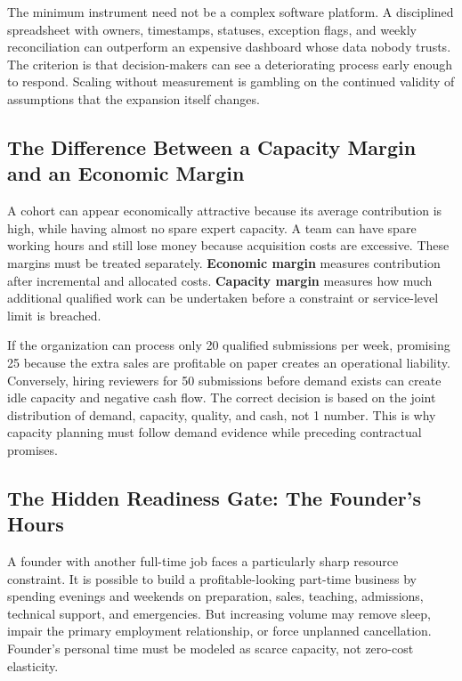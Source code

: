 The minimum instrument need not be a complex software platform. A disciplined spreadsheet with owners, timestamps, statuses, exception flags, and weekly reconciliation can outperform an expensive dashboard whose data nobody trusts. The criterion is that decision-makers can see a deteriorating process early enough to respond. Scaling without measurement is gambling on the continued validity of assumptions that the expansion itself changes.

\subsection{The Difference Between a Capacity Margin and an Economic Margin}
\label{sec:capacity_vs_economic_margin}

A cohort can appear economically attractive because its average contribution is high, while having almost no spare expert capacity. A team can have spare working hours and still lose money because acquisition costs are excessive. These margins must be treated separately. \textbf{Economic margin} measures contribution after incremental and allocated costs. \textbf{Capacity margin} measures how much additional qualified work can be undertaken before a constraint or service-level limit is breached.

If the organization can process only 20 qualified submissions per week, promising 25 because the extra sales are profitable on paper creates an operational liability. Conversely, hiring reviewers for 50 submissions before demand exists can create idle capacity and negative cash flow. The correct decision is based on the joint distribution of demand, capacity, quality, and cash, not 1 number. This is why capacity planning must follow demand evidence while preceding contractual promises.

\subsection{The Hidden Readiness Gate: The Founder's Hours}
\label{sec:hidden_gate_founder_hours}

A founder with another full-time job faces a particularly sharp resource constraint. It is possible to build a profitable-looking part-time business by spending evenings and weekends on preparation, sales, teaching, admissions, technical support, and emergencies. But increasing volume may remove sleep, impair the primary employment relationship, or force unplanned cancellation. Founder's personal time must be modeled as scarce capacity, not zero-cost elasticity.

